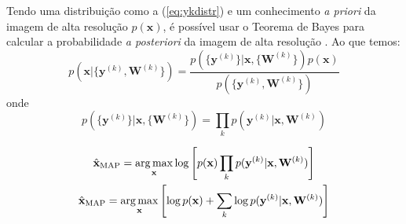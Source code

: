 Tendo uma distribuição como a (\ref{eq:ykdistr}) e um conhecimento \emph{a priori} da imagem de alta resolução $p(\mathbf{x})$, é possível usar o Teorema de Bayes para calcular a probabilidade \emph{a posteriori} da imagem de alta resolução \cite{nasrollahi2014super,pickup2007bayesian,pickup2007bayesian2} . Ao que temos:
\begin{equation}
	p(\mathbf{x} | \{\mathbf{y}^{(k)}, \mathbf{W}^{(k)}\}) = \frac{p(\{\mathbf{y}^{(k)}\} | \mathbf{x}, \{\mathbf{W}^{(k)}\}) p(\mathbf{x})}
	{p(\{\mathbf{y}^{(k)}, \mathbf{W}^{(k)}\})}
\end{equation}
onde
\begin{equation}
	p(\{\mathbf{y}^{(k)}\} | \mathbf{x}, \{\mathbf{W}^{(k)}\}) = 
	\prod_k p(\mathbf{y}^{(k)} | \mathbf{x}, \mathbf{W}^{(k)})
\end{equation}

\begin{gather}
	\hat{\mathbf{x}}_{\mathrm{MAP}} = \operatorname*{arg\,max}_{\mathbf{x}} \log \left[ p(\mathbf{x}) \prod_k p(\mathbf{y}^{(k)} | \mathbf{x}, \mathbf{W}^{(k)}) \right] \\
	\hat{\mathbf{x}}_{\mathrm{MAP}} = \operatorname*{arg\,max}_{\mathbf{x}} \left[ \log p(\mathbf{x}) + \sum_k \log p(\mathbf{y}^{(k)} | \mathbf{x}, \mathbf{W}^{(k)}) \right]
\end{gather}



